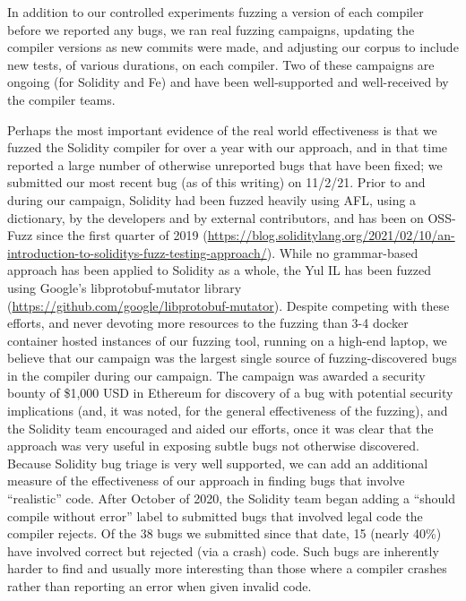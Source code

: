 In addition to our controlled experiments fuzzing a version of each compiler before we reported any bugs, we ran real fuzzing campaigns, updating the compiler versions as new commits were made, and adjusting our corpus to include new tests, of various durations, on each compiler.  Two of these campaigns are ongoing (for Solidity and Fe) and have been well-supported and well-received by the compiler teams.

\begin{sloppypar}
  Perhaps the most important evidence of the real world effectiveness is that we fuzzed the Solidity compiler for over a year with our approach, and in that time reported a large number of otherwise unreported bugs that have been fixed; we submitted our most recent bug (as of this writing) on 11/2/21.  Prior to and during our campaign, Solidity had been fuzzed heavily using AFL, using a dictionary, by the developers and by external contributors, and has been on OSS-Fuzz since the first quarter of 2019 (\url{https://blog.soliditylang.org/2021/02/10/an-introduction-to-soliditys-fuzz-testing-approach/}).  While no grammar-based approach has been applied to Solidity as a whole, the Yul IL has been fuzzed using Google's libprotobuf-mutator library (\url{https://github.com/google/libprotobuf-mutator}).  Despite competing with these efforts, and never devoting more resources to the fuzzing than 3-4 docker container hosted instances of our fuzzing tool, running on a high-end laptop, we believe that our campaign was the largest single source of fuzzing-discovered bugs in the compiler during our campaign.  The campaign was awarded a security bounty of \$1,000 USD in Ethereum for discovery of a bug with potential security implications (and, it was noted, for the general effectiveness of the fuzzing), and the Solidity team encouraged and aided our efforts, once it was clear that the approach was very useful in exposing subtle bugs not otherwise discovered.  Because Solidity bug triage is very well supported, we can add an additional measure of the effectiveness of our approach in finding bugs that involve ``realistic'' code.  After October of 2020, the Solidity team began adding a ``should compile without error'' label to submitted bugs that involved legal code the compiler rejects.  Of the 38 bugs we submitted since that date, 15 (nearly 40\%) have involved correct but rejected (via a crash) code.  Such bugs are inherently harder to find and usually more interesting than those where a compiler crashes rather than reporting an error when given invalid code.
\end{sloppypar}

